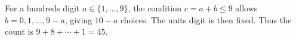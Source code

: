 For a hundreds digit $a\in\{1,\ldots,9\}$, the condition $c=a+b\le9$ allows $b=0,1,\ldots,9-a$, giving $10-a$ choices. The units digit is then fixed. Thus the count is $9+8+\cdots+1=\boxed{45}$.
